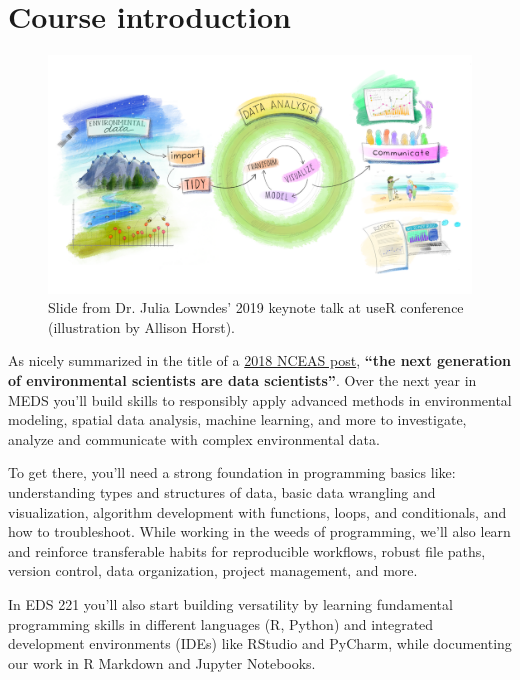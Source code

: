 \documentclass[
]{book}
\begin{document}
\hypertarget{course-introduction}{%
\section{Course introduction}\label{course-introduction}}

\begin{figure}

{\centering \includegraphics[width=1\linewidth]{images/eds_r4ds} 

}

\caption{Slide from Dr. Julia Lowndes' 2019 keynote talk at useR conference (illustration by Allison Horst).}\label{fig:unnamed-chunk-1}
\end{figure}

As nicely summarized in the title of a \href{https://www.nceas.ucsb.edu/news/next-generation-environmental-scientists-are-data-scientists}{2018 NCEAS post}, \textbf{``the next generation of environmental scientists are data scientists''}. Over the next year in MEDS you'll build skills to responsibly apply advanced methods in environmental modeling, spatial data analysis, machine learning, and more to investigate, analyze and communicate with complex environmental data.

To get there, you'll need a strong foundation in programming basics like: understanding types and structures of data, basic data wrangling and visualization, algorithm development with functions, loops, and conditionals, and how to troubleshoot. While working in the weeds of programming, we'll also learn and reinforce transferable habits for reproducible workflows, robust file paths, version control, data organization, project management, and more.

In EDS 221 you'll also start building versatility by learning fundamental programming skills in different languages (R, Python) and integrated development environments (IDEs) like RStudio and PyCharm, while documenting our work in R Markdown and Jupyter Notebooks.
\end{document}
